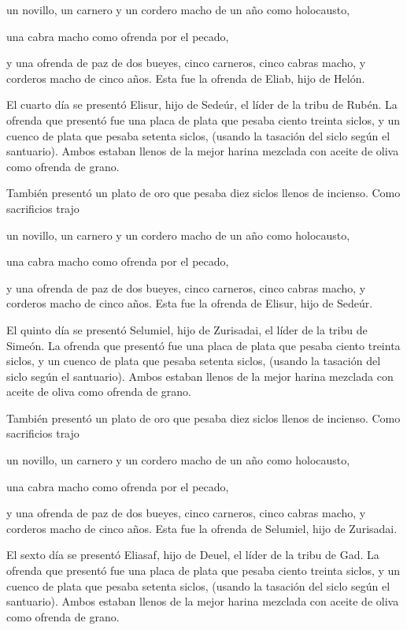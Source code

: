  un novillo, un carnero y un cordero macho de un año como
holocausto,

 una cabra macho como ofrenda por el pecado,

 y una ofrenda de paz de dos bueyes, cinco carneros,
cinco cabras macho, y corderos macho de cinco años. Esta fue la ofrenda
de Eliab, hijo de Helón.

 El cuarto día se presentó Elisur, hijo de Sedeúr, el
líder de la tribu de Rubén.  La ofrenda que presentó fue
una placa de plata que pesaba ciento treinta siclos, y un cuenco de
plata que pesaba setenta siclos, (usando la tasación del siclo según el
santuario). Ambos estaban llenos de la mejor harina mezclada con aceite
de oliva como ofrenda de grano.

 También presentó un plato de oro que pesaba diez siclos
llenos de incienso. Como sacrificios trajo

 un novillo, un carnero y un cordero macho de un año como
holocausto,

 una cabra macho como ofrenda por el pecado,

 y una ofrenda de paz de dos bueyes, cinco carneros,
cinco cabras macho, y corderos macho de cinco años. Esta fue la ofrenda
de Elisur, hijo de Sedeúr.

 El quinto día se presentó Selumiel, hijo de Zurisadai,
el líder de la tribu de Simeón.  La ofrenda que presentó
fue una placa de plata que pesaba ciento treinta siclos, y un cuenco de
plata que pesaba setenta siclos, (usando la tasación del siclo según el
santuario). Ambos estaban llenos de la mejor harina mezclada con aceite
de oliva como ofrenda de grano.

 También presentó un plato de oro que pesaba diez siclos
llenos de incienso. Como sacrificios trajo

 un novillo, un carnero y un cordero macho de un año como
holocausto,

 una cabra macho como ofrenda por el pecado,

 y una ofrenda de paz de dos bueyes, cinco carneros,
cinco cabras macho, y corderos macho de cinco años. Esta fue la ofrenda
de Selumiel, hijo de Zurisadai.

 El sexto día se presentó Eliasaf, hijo de Deuel, el
líder de la tribu de Gad.  La ofrenda que presentó fue
una placa de plata que pesaba ciento treinta siclos, y un cuenco de
plata que pesaba setenta siclos, (usando la tasación del siclo según el
santuario). Ambos estaban llenos de la mejor harina mezclada con aceite
de oliva como ofrenda de grano.

